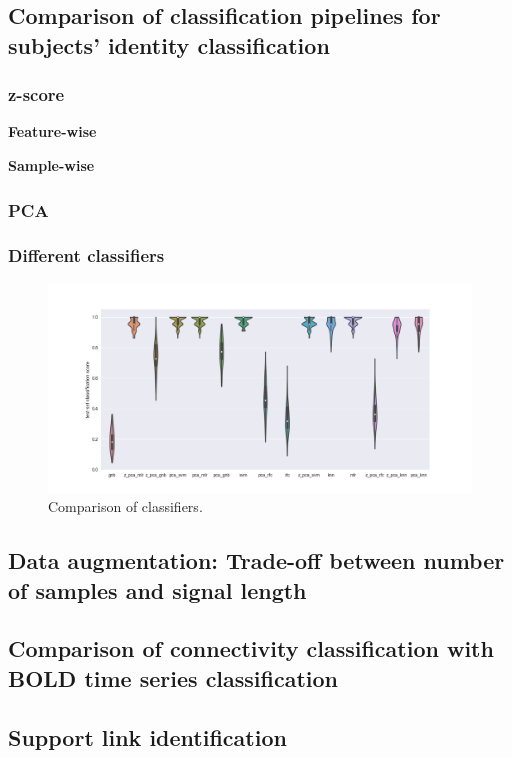 \documentclass[12pt, a4paper, final, fleqn]{article}
\begin{document}
\subsection{Comparison of classification pipelines for subjects' identity classification}
\subsubsection{z-score}

\textbf{Feature-wise}

\textbf{Sample-wise}
\subsubsection{PCA}
\subsubsection{Different classifiers}

\begin{figure}[!htb]
\begin{center}
\includegraphics[width=0.89\columnwidth]{comparison_clf_subj_moviedata}
  \caption[Comparison of classifiers]{Comparison of classifiers.
	  \label{fig:clf_comp}}
\end{center}
\end{figure}
\subsection{Data augmentation: Trade-off between number of samples and signal length}
\subsection{Comparison of connectivity classification with BOLD time series classification}
\subsection{Support link identification}
\end{document}
